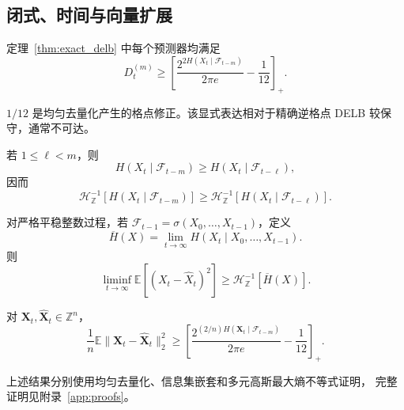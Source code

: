 \subsection{闭式、时间与向量扩展}
\label{subsec:closed_form_temporal}

\begin{Corollary}[闭式 DELB]
\label{cor:closed_form_delb}
定理~\ref{thm:exact_delb} 中每个预测器均满足
\begin{equation}
D_t^{(m)}
\geq
\left[
\frac{2^{2H(X_t\mid\mathcal F_{t-m})}}{2\pi e}
-\frac1{12}
\right]_+ .
\label{eq:discrete_mse_bound}
\end{equation}
\end{Corollary}

\(1/12\) 是均匀去量化产生的格点修正。该显式表达相对于精确逆格点 DELB
较保守，通常不可达。

\begin{Proposition}[预测提前期单调性]
\label{prop:general_horizon_monotonicity}
若 \(1\leq\ell<m\)，则
\begin{equation}
H(X_t\mid\mathcal F_{t-m})
\geq H(X_t\mid\mathcal F_{t-\ell}),
\label{eq:general_horizon_entropy}
\end{equation}
因而
\begin{equation}
\mathcal H_{\mathbb Z}^{-1}[H(X_t\mid\mathcal F_{t-m})]
\geq
\mathcal H_{\mathbb Z}^{-1}[H(X_t\mid\mathcal F_{t-\ell})].
\label{eq:general_horizon_delb}
\end{equation}
\end{Proposition}

\begin{Corollary}[平稳一步极限]
\label{cor:general_stationary_delb}
对严格平稳整数过程，若
\(\mathcal F_{t-1}=\sigma(X_0,\ldots,X_{t-1})\)，定义
\begin{equation}
\overline H(X)
=\lim_{t\to\infty}H(X_t\mid X_0,\ldots,X_{t-1}).
\label{eq:general_entropy_rate}
\end{equation}
则
\begin{equation}
\liminf_{t\to\infty}
\mathbb E[(X_t-\widehat X_t)^2]
\geq
\mathcal H_{\mathbb Z}^{-1}[\overline H(X)].
\label{eq:general_stationary_exact_bound}
\end{equation}
\end{Corollary}

\begin{Corollary}
\label{cor:general_vector_delb}
对 \(\mathbf X_t,\widehat{\mathbf X}_t\in\mathbb Z^n\)，
\begin{equation}
\frac1n\mathbb E\|\mathbf X_t-\widehat{\mathbf X}_t\|_2^2
\geq
\left[
\frac{2^{(2/n)H(\mathbf X_t\mid\mathcal F_{t-m})}}{2\pi e}
-\frac1{12}
\right]_+ .
\label{eq:general_vector_delb}
\end{equation}
\end{Corollary}

上述结果分别使用均匀去量化、信息集嵌套和多元高斯最大熵不等式证明，
完整证明见附录~\ref{app:proofs}。
